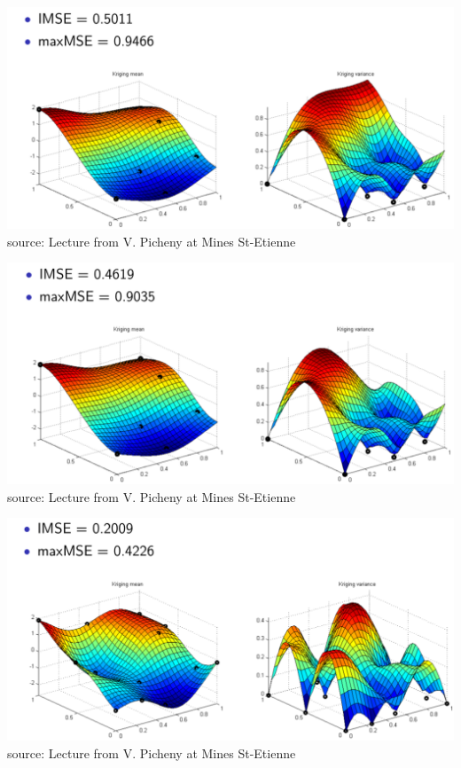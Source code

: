 \documentclass{beamer}
\begin{document}
\begin{frame}{}
\vspace{5mm}
\includegraphics[width=\textwidth]{figures/adaptative3}\\
\vfill
source: Lecture from V. Picheny at Mines St-Etienne
\end{frame}

\begin{frame}{}
\vspace{5mm}
\includegraphics[width=\textwidth]{figures/adaptative4}\\
\vfill
source: Lecture from V. Picheny at Mines St-Etienne
\end{frame}

\begin{frame}{}
\vspace{5mm}
\includegraphics[width=\textwidth]{figures/adaptative6}\\
\vfill
source: Lecture from V. Picheny at Mines St-Etienne
\end{frame}
\end{document}
